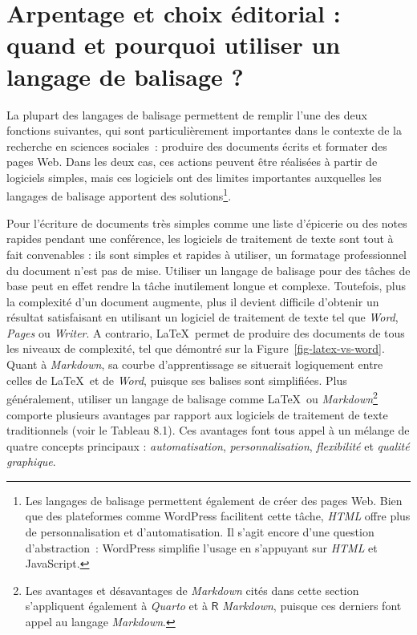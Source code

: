 \documentclass[
  letterpaper,
  DIV=11,
  numbers=noendperiod,
  oneside]{scrreprt}
\begin{document}
\hypertarget{arpentage-et-choix-uxe9ditorial-quand-et-pourquoi-utiliser-un-langage-de-balisage}{%
\section{Arpentage et choix éditorial : quand et pourquoi utiliser un
langage de balisage
?}\label{arpentage-et-choix-uxe9ditorial-quand-et-pourquoi-utiliser-un-langage-de-balisage}}

La plupart des langages de balisage permettent de remplir l'une des deux
fonctions suivantes, qui sont particulièrement importantes dans le
contexte de la recherche en sciences sociales~: produire des documents
écrits et formater des pages Web. Dans les deux cas, ces actions peuvent
être réalisées à partir de logiciels simples, mais ces logiciels ont des
limites importantes auxquelles les langages de balisage apportent des
solutions\footnote{Les langages de balisage permettent également de
  créer des pages Web. Bien que des plateformes comme WordPress
  facilitent cette tâche, \emph{HTML} offre plus de personnalisation et
  d'automatisation. Il s'agit encore d'une question d'abstraction~:
  WordPress simplifie l'usage en s'appuyant sur \emph{HTML} et
  JavaScript.}.

Pour l'écriture de documents très simples comme une liste d'épicerie ou
des notes rapides pendant une conférence, les logiciels de traitement de
texte sont tout à fait convenables : ils sont simples et rapides à
utiliser, un formatage professionnel du document n'est pas de mise.
Utiliser un langage de balisage pour des tâches de base peut en effet
rendre la tâche inutilement longue et complexe. Toutefois, plus la
complexité d'un document augmente, plus il devient difficile d'obtenir
un résultat satisfaisant en utilisant un logiciel de traitement de texte
tel que \emph{Word}, \emph{Pages} ou \emph{Writer}. A contrario,
\LaTeX{}~permet de produire des documents de tous les niveaux de
complexité, tel que démontré sur la Figure~\ref{fig-latex-vs-word}.
Quant à \emph{Markdown}, sa courbe d'apprentissage se situerait
logiquement entre celles de \LaTeX{}~et de \emph{Word}, puisque ses
balises sont simplifiées. Plus généralement, utiliser un langage de
balisage comme \LaTeX{}~ou \emph{Markdown}\footnote{Les avantages et
  désavantages de \emph{Markdown} cités dans cette section s'appliquent
  également à \emph{Quarto} et à \(\textsf{R}\) \emph{Markdown}, puisque
  ces derniers font appel au langage \emph{Markdown}.} comporte
plusieurs avantages par rapport aux logiciels de traitement de texte
traditionnels (voir le Tableau 8.1). Ces avantages font tous appel à un
mélange de quatre concepts principaux : \emph{automatisation},
\emph{personnalisation}, \emph{flexibilité} et \emph{qualité graphique}.
\end{document}
